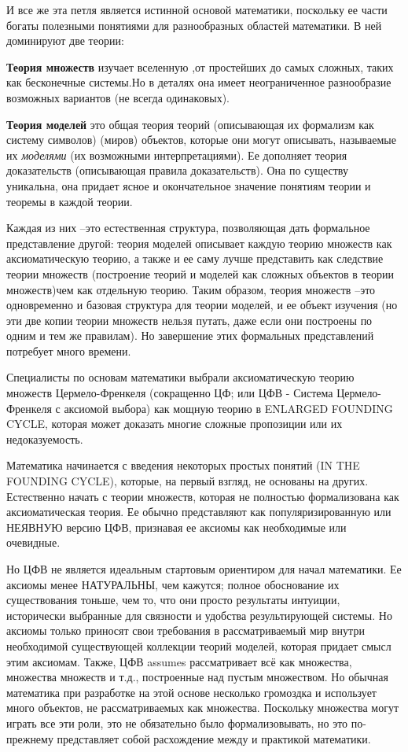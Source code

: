 И все же эта петля является истинной основой математики, поскольку ее части богаты полезными понятиями для разнообразных областей математики. 
В ней доминируют две теории: 
 
{\bf Теория множеств} изучает вселенную ,от простейших до самых сложных, таких как бесконечные системы.Но в деталях она имеет неограниченное разнообразие возможных вариантов (не всегда одинаковых).

 
{\bf Теория моделей} это общая теория теорий (описывающая их формализм как систему символов) (миров) объектов, которые они могут описывать, называемые их {\it моделями} (их возможными интерпретациями). Ее дополняет теория доказательств (описывающая правила доказательств). Она по существу уникальна, она придает ясное и окончательное значение понятиям теории и теоремы в каждой теории.  
 
Каждая из них –это естественная структура, позволяющая дать формальное представление другой: теория моделей описывает каждую теорию множеств как аксиоматическую теорию, а также и ее саму лучше представить как следствие теории множеств (построение теорий и моделей как сложных объектов в теории множеств)чем как отдельную теорию. Таким образом, теория множеств –это одновременно и базовая структура для теории моделей, и ее объект изучения (но эти две копии теории множеств нельзя путать, даже если они построены по одним и тем же правилам). Но завершение этих формальных представлений потребует много времени. 

 
Специалисты по основам математики выбрали аксиоматическую теорию множеств Цермело-Френкеля (сокращенно ЦФ; или ЦФВ - Система Цермело-Френкеля с аксиомой выбора) как мощную теорию в ENLARGED FOUNDING CYCLE, которая может доказать многие сложные пропозиции или их недоказуемость. 
 
Математика начинается с введения некоторых простых понятий (IN THE FOUNDING CYCLE), которые, на первый взгляд, не основаны на других. Естественно начать с теории множеств, которая не полностью формализована как аксиоматическая теория. 
Ее обычно представляют как популяризированную или НЕЯВНУЮ версию ЦФВ, признавая ее аксиомы как необходимые или очевидные.

Но ЦФВ не является идеальным стартовым ориентиром для начал математики. Ее аксиомы менее НАТУРАЛЬНЫ, чем кажутся; полное обоснование их существования тоньше, чем то, что они просто результаты интуиции, исторически выбранные для связности и удобства результирующей системы. Но аксиомы только приносят свои требования в рассматриваемый мир внутри необходимой существующей коллекции теорий моделей, которая придает смысл этим аксиомам. Также, ЦФВ assumes  рассматривает всё как множества, множества множеств и т.д., построенные над пустым множеством. Но обычная математика при разработке на этой основе несколько громоздка и использует много объектов, не рассматриваемых как множества. Поскольку множества могут играть все эти роли, это не обязательно было формализовывать, но это по-прежнему представляет собой расхождение между   и практикой математики. 



